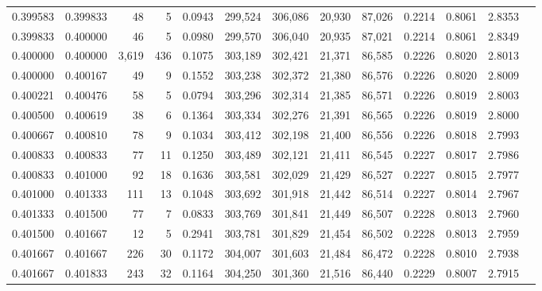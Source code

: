 \begin{tabular}{rrrrrrrrrrrrr}
0.399583 & 0.399833 &    48 &   5 &                                     0.0943 & 299,524 & 306,086 &  20,930 &  87,026 & 0.2214 & 0.8061 & 2.8353 \\
0.399833 & 0.400000 &    46 &   5 &                                     0.0980 & 299,570 & 306,040 &  20,935 &  87,021 & 0.2214 & 0.8061 & 2.8349 \\
0.400000 & 0.400000 & 3,619 & 436 &                                     0.1075 & 303,189 & 302,421 &  21,371 &  86,585 & 0.2226 & 0.8020 & 2.8013 \\
0.400000 & 0.400167 &    49 &   9 &                                     0.1552 & 303,238 & 302,372 &  21,380 &  86,576 & 0.2226 & 0.8020 & 2.8009 \\
0.400221 & 0.400476 &    58 &   5 &                                     0.0794 & 303,296 & 302,314 &  21,385 &  86,571 & 0.2226 & 0.8019 & 2.8003 \\
0.400500 & 0.400619 &    38 &   6 &                                     0.1364 & 303,334 & 302,276 &  21,391 &  86,565 & 0.2226 & 0.8019 & 2.8000 \\
0.400667 & 0.400810 &    78 &   9 &                                     0.1034 & 303,412 & 302,198 &  21,400 &  86,556 & 0.2226 & 0.8018 & 2.7993 \\
0.400833 & 0.400833 &    77 &  11 &                                     0.1250 & 303,489 & 302,121 &  21,411 &  86,545 & 0.2227 & 0.8017 & 2.7986 \\
0.400833 & 0.401000 &    92 &  18 &                                     0.1636 & 303,581 & 302,029 &  21,429 &  86,527 & 0.2227 & 0.8015 & 2.7977 \\
0.401000 & 0.401333 &   111 &  13 &                                     0.1048 & 303,692 & 301,918 &  21,442 &  86,514 & 0.2227 & 0.8014 & 2.7967 \\
0.401333 & 0.401500 &    77 &   7 &                                     0.0833 & 303,769 & 301,841 &  21,449 &  86,507 & 0.2228 & 0.8013 & 2.7960 \\
0.401500 & 0.401667 &    12 &   5 &                                     0.2941 & 303,781 & 301,829 &  21,454 &  86,502 & 0.2228 & 0.8013 & 2.7959 \\
0.401667 & 0.401667 &   226 &  30 &                                     0.1172 & 304,007 & 301,603 &  21,484 &  86,472 & 0.2228 & 0.8010 & 2.7938 \\
0.401667 & 0.401833 &   243 &  32 &                                     0.1164 & 304,250 & 301,360 &  21,516 &  86,440 & 0.2229 & 0.8007 & 2.7915 \\

\end{tabular}
